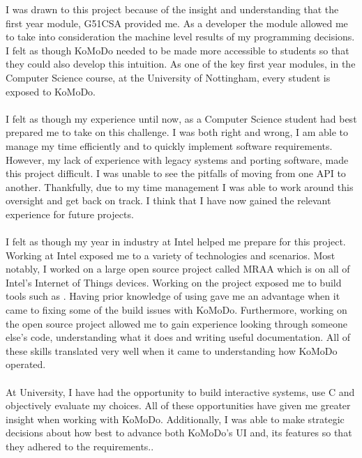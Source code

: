 %
%
%
I was drawn to this project because of the insight and understanding that the first year module, G51CSA provided me. As a developer the module allowed me to take into consideration the machine level results of my programming decisions. I felt as though KoMoDo needed to be made more accessible to students so that they could also develop this intuition. As one of the key first year modules, in the Computer Science course, at the University of Nottingham, every student is exposed to KoMoDo.\\\\
%
I felt as though my experience until now, as a Computer Science student had best prepared me to take on this challenge. I was both right and wrong, I am able to manage my time efficiently and to quickly implement software requirements. However, my lack of experience with legacy systems and porting software, made this project difficult. I was unable to see the pitfalls of moving from one API to another. Thankfully, due to my time management I was able to work around this oversight and get back on track. I think that I have now gained the relevant experience for future projects.\\\\
%
I felt as though my year in industry at Intel helped me prepare for this project. Working at Intel exposed me to a variety of technologies and scenarios. Most notably, I worked on a large open source project called MRAA which is on all of Intel's Internet of Things devices. Working on the project exposed me to build tools such as . Having prior knowledge of using  gave me an advantage when it came to fixing some of the build issues with KoMoDo. Furthermore, working on the open source project allowed me to gain experience looking through someone else's code, understanding what it does and writing useful documentation. All of these skills translated very well when it came to understanding how KoMoDo operated.\\\\
%
At University, I have had the opportunity to build interactive systems, use C and objectively evaluate my choices. All of these opportunities have given me greater insight when working with KoMoDo. Additionally, I was able to make strategic decisions about how best to advance both KoMoDo's UI and, its features so that they adhered to the requirements..\\\\
